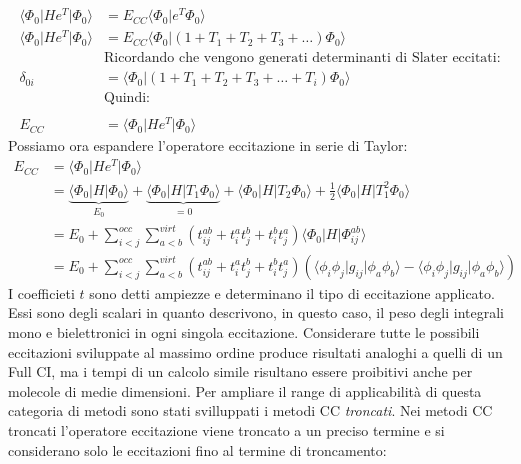 \documentclass[oneside]{amsbook}
\numberwithin{section}{chapter}
\numberwithin{equation}{section}
\numberwithin{figure}{section}
\begin{document}
\begin{equation}
\begin{aligned}
\langle \Phi_0 \vert H e^T\vert \Phi_0 \rangle &= E_{CC}\langle \Phi_0 \vert e^T\Phi_0 \rangle\\
\langle \Phi_0 \vert H e^T\vert \Phi_0 \rangle &= E_{CC}\langle \Phi_0 \vert (1+T_1+T_2+T_3+\ldots)\Phi_0 \rangle\\
&\text{Ricordando che vengono generati determinanti di Slater eccitati:} \\
\delta_{0i} &= \langle \Phi_0 \vert (1+T_1+T_2+T_3+\ldots+T_i)\Phi_0 \rangle\\
&\text{Quindi:}\\ \\
E_{CC}&=\langle \Phi_0 \vert H e^T\vert \Phi_0 \rangle 
\end{aligned}
\end{equation}
Possiamo ora espandere l'operatore eccitazione in serie di Taylor:
\begin{equation}
\begin{aligned}
E_{CC}&=\langle \Phi_0 \vert H e^T\vert \Phi_0 \rangle  \\
&= \underbrace{\langle \Phi_0 \vert H \vert \Phi_0 \rangle}_{E_0}+\underbrace{\langle \Phi_0 \vert H \vert T_1\Phi_0 \rangle}_{=0}+\langle \Phi_0 \vert H \vert T_2 \Phi_0 \rangle+ \frac{1}{2} \langle \Phi_0 \vert H \vert T_1^2 \Phi_0 \rangle\\
&= E_0+ \sum \limits _{i<j} ^{occ}\sum \limits _{a<b} ^{virt}\left(t_{ij}^{ab}+t^a_it^b_j+t^b_it^a_j\right)\langle\Phi_0\vert H\vert\Phi^{ab}_{ij}\rangle \\
&= E_0+ \sum \limits _{i<j} ^{occ}\sum \limits _{a<b} ^{virt}\left(t_{ij}^{ab}+t^a_it^b_j+t^b_it^a_j\right) \left(\langle \phi_i \phi_j \vert g_{ij} \vert \phi_a \phi_b \rangle- \langle  \phi_i \phi_j\vert g_{ij} \vert \phi_a \phi_b \rangle\right)
\end{aligned}
\end{equation}
I coefficieti $t$ sono detti ampiezze e determinano il tipo di eccitazione applicato. Essi sono degli scalari in quanto descrivono, in questo caso, il peso degli integrali mono e bielettronici in ogni singola eccitazione.
Considerare tutte le possibili eccitazioni sviluppate al massimo ordine produce risultati analoghi a quelli di un Full CI, ma i tempi di un calcolo simile risultano essere proibitivi anche per molecole di medie dimensioni. Per ampliare il range di applicabilità di questa categoria di metodi sono stati svilluppati i metodi CC \emph{troncati}.
Nei metodi CC troncati l'operatore eccitazione viene troncato a un preciso termine e si considerano solo le eccitazioni fino al termine di troncamento:
\end{document}
